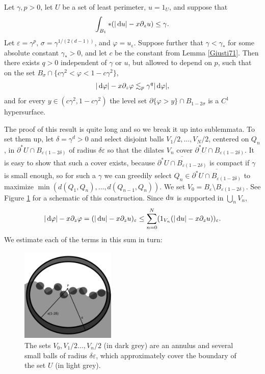 \begin{lemma}\label{main mollifier lemma}
Let $\gamma, p > 0$, let $U$ be a set of least perimeter, $u = 1_U$, and suppose that
\begin{equation}\label{hypothesis on main mollifier lemma}
\int_{B_1} *(|\mathop{}\!\mathrm{d} u| - x\partial_z u) \leq \gamma.
\end{equation}
Let $\varepsilon = \gamma^p$, $\sigma = \gamma^{1/(2(d - 1))}$, and $\varphi = u_\varepsilon$.
Suppose further that $\gamma < \gamma_*$ for some absolute constant $\gamma_* > 0$, and let $c$ be the constant from Lemma \ref{Giusti71}.
Then there exists $q > 0$ independent of $\gamma$ or $u$, but allowed to depend on $p$, such that on the set $B_\sigma \cap \{c\gamma^2 < \varphi < 1 - c\gamma^2\}$,
\begin{equation}\label{claim on main mollifier lemma}
|\mathop{}\!\mathrm{d} \varphi| - x\partial_z \varphi \lesssim_p \gamma^q |\mathop{}\!\mathrm{d} \varphi|,
\end{equation}
and for every $y \in (c\gamma^2, 1 - c\gamma^2)$ the level set $\partial \{\varphi > y\} \cap B_{1 - 2\sigma}$ is a $C^1$ hypersurface.
\end{lemma}

The proof of this result is quite long and so we break it up into sublemmata.
To set them up, let $\delta = \gamma^d > 0$ and select disjoint balls $V_1/2, \dots, V_N/2$, centered on $Q_n$, in $\partial^* U \cap B_{\varepsilon(1 - 2\delta)}$ of radius $\delta\varepsilon$ so that the dilates $V_n$ cover $\partial^* U \cap B_{\varepsilon(1 - 2\delta)}$.
It is easy to show that such a cover exists, because $\overline{\partial^* U \cap B_{\varepsilon(1 - 2\delta)}}$ is compact if $\gamma$ is small enough, so for such a $\gamma$ we can greedily select $Q_n \in \overline{\partial^* U \cap B_{\varepsilon(1 - 2\delta)}}$ to maximize $\min(d(Q_1, Q_n), \dots, d(Q_{n - 1}, Q_n))$.
We set $V_0 = B_\varepsilon \setminus B_{\varepsilon(1 - 2\delta)}$.
See Figure \ref{covering diagram} for a schematic of this construction.
Since $\mathop{}\!\mathrm{d} u$ is supported in $\bigcup_n V_n$,
$$|\mathop{}\!\mathrm{d} \varphi| - x\partial_z \varphi = (|\mathop{}\!\mathrm{d} u| - x\partial_zu)_\varepsilon \leq \sum_{n=0}^N (1_{V_n}(|\mathop{}\!\mathrm{d} u| - x\partial_zu))_\varepsilon.$$
We estimate each of the terms in this sum in turn:

\begin{figure}[ht]\label{covering diagram}
\caption{The sets $V_0, V_1/2 \dots, V_n/2$ (in dark grey) are an annulus and several small balls of radius $\delta \varepsilon$, which approximately cover the boundary of the set $U$ (in light grey).}
\includegraphics[width=0.4\textwidth]{covering lemma}
\end{figure}

